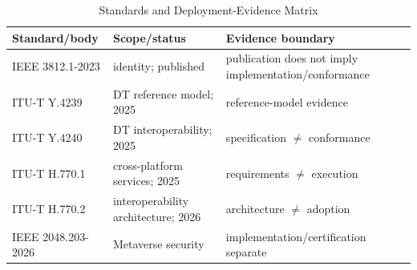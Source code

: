 \begin{table}[H]\centering\caption{Standards and Deployment-Evidence Matrix}\label{tab:standardsmatrix}\scriptsize\begin{tabularx}{\columnwidth}{p{}p{}Y}\toprule Standard/body & Scope/status & Evidence boundary\\\midrule IEEE 3812.1-2023 & identity; published & publication does not imply implementation/conformance\\ ITU-T Y.4239 & DT reference model; 2025 & reference-model evidence\\ ITU-T Y.4240 & DT interoperability; 2025 & specification $\neq$ conformance\\ ITU-T H.770.1 & cross-platform services; 2025 & requirements $\neq$ execution\\ ITU-T H.770.2 & interoperability architecture; 2026 & architecture $\neq$ adoption\\ IEEE 2048.203-2026 & Metaverse security & implementation/certification separate\\\bottomrule\end{tabularx}\end{table}